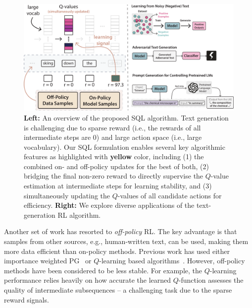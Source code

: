 \begin{figure}
    \centering
    \includegraphics[width=0.99\linewidth]{figures/20211003-figure1.pdf}
    \vspace{-4pt}
    \caption{
    \textbf{Left:} An overview of the proposed SQL algorithm. Text generation is challenging due to sparse reward (i.e., the rewards of all intermediate steps are $0$) and large action space (i.e., large vocabulary).
    Our SQL formulation enables several key algorithmic features as highlighted with \textcolor[HTML]{D0A28F}{\textbf{yellow}} color, including (1) the combined on- and off-policy updates for the best of both, (2) bridging the final non-zero reward to directly supervise the $Q$-value estimation at intermediate steps for learning stability, and (3) simultaneously updating the $Q$-values of all candidate actions for efficiency. 
    \textbf{Right:} We explore diverse applications of the text-generation RL algorithm.
    }
    \label{fig:first-figure}
    \vspace{-7pt}
\end{figure}


Another set of work has resorted to \emph{off-policy} RL. The key advantage is that samples from other sources, e.g., human-written text, can be used, making them more data efficient than on-policy methods. Previous work has used either importance weighted PG~\citep{pang2021text,zhou2017end,kandasamy2016batch} or $Q$-learning based algorithms~\citep{guo2015generating,jaques2020human,narasimhan2015language}. However, off-policy methods have been considered to be less stable. For example, the $Q$-learning performance relies heavily on how accurate the learned $Q$-function assesses the quality of intermediate subsequences -- a challenging task due to the sparse reward signals.


